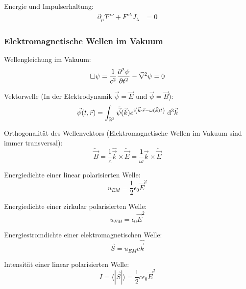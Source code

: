 \documentclass[11pt]{article}
\numberwithin{equation}{section}
\begin{document}
				\noindent
				Energie und Impulserhaltung:
				\begin{equation}
					\begin{aligned}
						\partial_\mu T^{\mu\nu} + F^{\nu\lambda} J_\lambda &= 0
					\end{aligned}
				\end{equation}


			\subsubsection{Elektromagnetische Wellen im Vakuum}
				\noindent
				Wellengleichung im Vakuum:
				\begin{equation}
					\Box\psi = \frac{1}{c^2} \frac{\partial^2 \psi}{\partial t^2} - \vec{\nabla}^2 \psi = 0
				\end{equation}

				\noindent
				Vektorwelle (In der Elektrodynamik $\vec{\psi}=\vec{E}$ und $ \vec{\psi}=\vec{B}$):
				\begin{equation}
					\vec{\psi}(t,\vec{r}) = \int_{\mathbb{R}^3} \tilde{\vec{\psi}} (\vec{k}) e^{\mathrm{i}\left(\vec{k}\cdot\vec{r} - \omega(\vec{k})t \right)}\; \mathrm{d}^3\vec{k}
				\end{equation}

				\noindent
				Orthogonalität des Wellenvektors (Elektromagnetische Wellen im Vakuum sind immer transversal):
				\begin{equation}
					\tilde{\vec{B}} = \frac{1}{c}\hat{\vec{k}}\times\tilde{\vec{E}} = \frac{1}{\omega}\vec{k}\times\tilde{\vec{E}}
				\end{equation}

				\noindent
				Energiedichte einer linear polarisierten Welle:
				\begin{equation}
					u_{EM} = \frac{1}{2}\epsilon_0\vec{E}^2
				\end{equation}

				\noindent
				Energiedichte einer zirkular polarisierten Welle:
				\begin{equation}
					u_{EM} = \epsilon_0\vec{E}^2
				\end{equation}

				\noindent
				Energiestromdichte einer elektromagnetischen Welle:
				\begin{equation}
					\vec{S} = u_{EM}c\hat{\vec{k}}
				\end{equation}

				\noindent
				Intensität einer linear polarisierten Welle:
				\begin{equation}
					I = \langle|\vec{S}|\rangle = \frac{1}{2}c\epsilon_0\vec{E}^2
				\end{equation}
\end{document}

